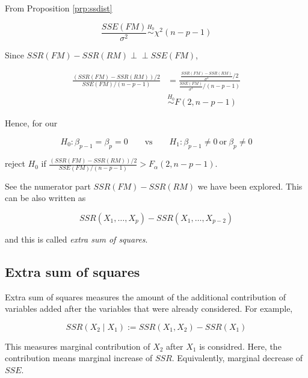 \documentclass[]{book}
\theoremstyle{definition}
\theoremstyle{definition}
\theoremstyle{definition}
\theoremstyle{remark}
\let\BeginKnitrBlock\begin \let\EndKnitrBlock\end
\begin{document}
From Proposition \ref{prp:ssdist}

\[\frac{SSE(FM)}{\sigma^2} \stackrel{H_0}{\sim}\chi^2(n - p - 1)\]

Since \(SSR(FM) - SSR(RM) \perp\!\!\!\perp SSE(FM)\),

\begin{equation}
  \begin{split}
    \frac{(SSR(FM) - SSR(RM)) / 2}{SSE(FM) / (n - p - 1)} & = \frac{\frac{SSR(FM) - SSR(RM)}{\sigma^2} / 2}{\frac{SSE(FM)}{\sigma^2} / (n - p - 1)} \\
    & \stackrel{H_0}{\sim}F(2, n - p - 1)
  \end{split}
  \label{eq:ssrfmstat}
\end{equation}

Hence, for our

\[H_0: \beta_{p - 1} = \beta_p = 0 \qquad \text{vs} \qquad H_1: \beta_{p - 1} \neq 0 \:\text{or}\: \beta_p \neq 0\]

reject \(H_0\) if \(\frac{(SSR(FM) - SSR(RM)) / 2}{SSE(FM) / (n - p - 1)} > F_{\alpha}(2, n - p - 1)\).

See the numerator part \(SSR(FM) - SSR(RM)\) we have been explored. This can be also written as

\[SSR(X_1, \ldots, X_p) - SSR(X_1, \ldots, X_{p - 2})\]

and this is called \emph{extra sum of squares}.

\hypertarget{extra-sum-of-squares}{%
\subsection{Extra sum of squares}\label{extra-sum-of-squares}}

\BeginKnitrBlock{definition}[Extra sum of squares]
\protect\hypertarget{def:ess}{}{\label{def:ess} {} }Extra sum of squares measures the amount of the additional contribution of variables added after the variables that were already considered. For example,

\[SSR(X_2 \mid X_1) := SSR(X_1, X_2) - SSR(X_1)\]

This measures marginal contribution of \(X_2\) after \(X_1\) is considred. Here, the contribution means marginal increase of \(SSR\). Equivalently, marginal decrease of \(SSE\).
\EndKnitrBlock{definition}
\end{document}
